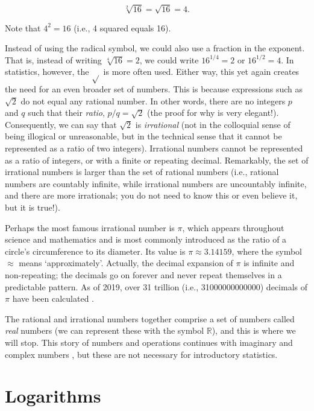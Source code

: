 \documentclass[
  openany]{scrbook}
\begin{document}
\[\sqrt[2]{16} = \sqrt{16} = 4.\]

Note that \(4^{2} = 16\) (i.e., 4 squared equals 16).

Instead of using the radical symbol, we could also use a fraction in the exponent.
That is, instead of writing \(\sqrt[4]{16} = 2\), we could write \(16^{1/4} = 2\) or \(16^{1/2} = 4\).
In statistics, however, the \(\sqrt{}\) is more often used.
Either way, this yet again creates the need for an even broader set of numbers.
This is because expressions such as \(\sqrt{2}\) do not equal any rational number.
In other words, there are no integers \(p\) and \(q\) such that their \emph{ratio}, \(p/q = \sqrt{2}\) (the proof for why is very elegant!).
Consequently, we can say that \(\sqrt{2}\) is \emph{irrational} (not in the colloquial sense of being illogical or unreasonable, but in the technical sense that it cannot be represented as a ratio of two integers).
Irrational numbers cannot be represented as a ratio of integers, or with a finite or repeating decimal.
Remarkably, the set of irrational numbers is larger than the set of rational numbers (i.e., rational numbers are countably infinite, while irrational numbers are uncountably infinite, and there are more irrationals; you do not need to know this or even believe it, but it is true!).

Perhaps the most famous irrational number is \(\pi\), which appears throughout science and mathematics and is most commonly introduced as the ratio of a circle's circumference to its diameter.
Its value is \(\pi \approx 3.14159\), where the symbol \(\approx\) means `approximately'.
Actually, the decimal expansion of \(\pi\) is infinite and non-repeating; the decimals go on forever and never repeat themselves in a predictable pattern.
As of 2019, over 31 trillion (i.e., 31000000000000) decimals of \(\pi\) have been calculated \citep{Yee2019}.

The rational and irrational numbers together comprise a set of numbers called \emph{real} numbers (we can represent these with the symbol \(\mathbb{R}\)), and this is where we will stop.
This story of numbers and operations continues with imaginary and complex numbers \citep{Courant1996, Pastor2008}, but these are not necessary for introductory statistics.

\hypertarget{logarithms}{%
\section{Logarithms}\label{logarithms}}
\end{document}
